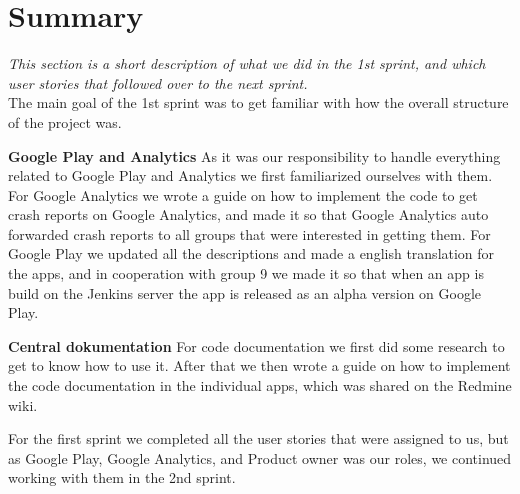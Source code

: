 \section{Summary} 
\textit{This section is a short description of what we did in the 1st sprint, and which user stories that followed over to the next sprint.}\\

The main goal of the 1st sprint was to get familiar with how the overall structure of the project was. 

\textbf{Google Play and Analytics}
As it was our responsibility to handle everything related to Google Play and Analytics we first familiarized ourselves with them. For Google Analytics we wrote a guide on how to implement the code to get crash reports on Google Analytics, and made it so that Google Analytics auto forwarded crash reports to all groups that were interested in getting them. For Google Play we updated all the descriptions and made a english translation for the apps, and in cooperation with group 9 we made it so that when an app is build on the Jenkins server the app is released as an alpha version on Google Play.

\textbf{Central dokumentation}
For code documentation we first did some research to get to know how to use it. After that we then wrote a guide on how to implement the code documentation in the individual apps, which was shared on the Redmine wiki.


For the first sprint we completed all the user stories that were assigned to us, but as Google Play, Google Analytics, and Product owner was our roles, we continued working with them in the 2nd sprint.